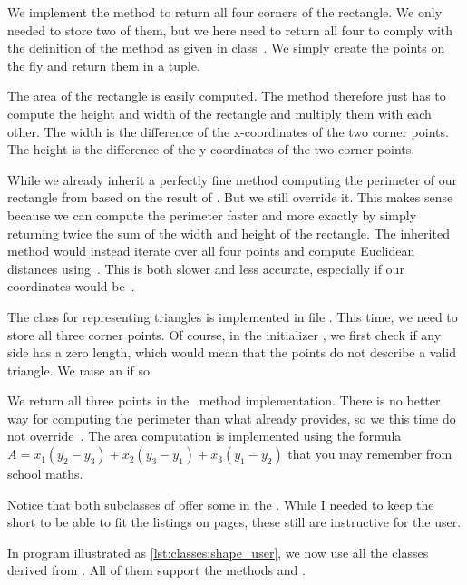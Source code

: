 We implement the method  to return all four corners of the rectangle.
We only needed to store two of them, but we here need to return all four to comply with the definition of the method as given in class~.
We simply create the points on the fly and return them in a tuple.

The area of the rectangle is easily computed.
The method  therefore just has to compute the height and width of the rectangle and multiply them with each other.
The width is the difference of the x\nobreakdashes-coordinates of the two corner points.
The height is the difference of the y\nobreakdashes-coordinates of the two corner points.

While we already inherit a perfectly fine method  computing the perimeter of our rectangle from  based on the result of .
But we still override it.
This makes sense because we can compute the perimeter faster and more exactly by simply returning twice the sum of the width and height of the rectangle.
The inherited  method would instead iterate over all four points and compute Euclidean distances using~.
This is both slower and less accurate, especially if our coordinates would be~.

The class  for representing triangles is implemented in file .
This time, we need to store all three corner points.
Of course, in the initializer , we first check if any side has a zero length, which would mean that the points do not describe a valid triangle.
We raise an  if so.

We return all three points in the ~method implementation.
There is no better way for computing the perimeter than what  already provides, so we this time do not override~.
The area computation is implemented using the formula~$A=x_1(y_2-y_3)+x_2(y_3-y_1)+x_3(y_1-y_2)$ that you may remember from school maths.

Notice that both subclasses of  offer some  in the .
While I needed to keep the  short to be able to fit the listings on pages, these  still are instructive for the user.

In program  illustrated as \cref{lst:classes:shape_user}, we now use all the classes derived from .
All of them support the methods  and .

